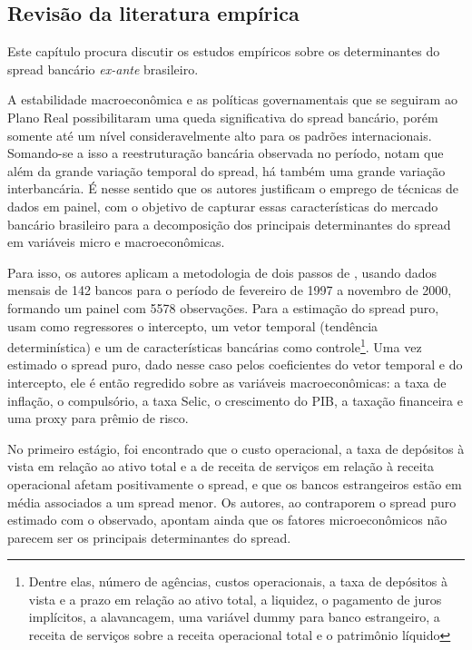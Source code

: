 \documentclass[a4paper,
               article,
               12pt,
               openany,
               oneside,
               english,
               brazil]{abntex2}
\numberwithin{equation}{section}
\begin{document}
\subsection{Revisão da literatura empírica}

    Este capítulo procura discutir os estudos empíricos sobre os determinantes do spread bancário \textit{ex-ante} brasileiro.

    A estabilidade macroeconômica e as políticas governamentais que se seguiram ao Plano Real possibilitaram uma queda significativa do spread bancário, porém somente até um nível consideravelmente alto para os padrões internacionais. Somando-se a isso a reestruturação bancária observada no período, \textcite{afanasieff02} notam que além da grande variação temporal do spread, há também uma grande variação interbancária. É nesse sentido que os autores justificam o emprego de técnicas de dados em painel, com o objetivo de capturar essas características do mercado bancário brasileiro para a decomposição dos principais determinantes do spread em variáveis micro e macroeconômicas.

    Para isso, os autores aplicam a metodologia de dois passos de \textcite{hoesaunders}, usando dados mensais de 142 bancos para o período de fevereiro de 1997 a novembro de 2000, formando um painel com 5578 observações. Para a estimação do spread puro, usam como regressores o intercepto, um vetor temporal (tendência determinística) e um de características bancárias como controle\footnote{Dentre elas, número de agências, custos operacionais, a taxa de depósitos à vista e a prazo em relação ao ativo total, a liquidez, o pagamento de juros implícitos, a alavancagem, uma variável dummy para banco estrangeiro, a receita de serviços sobre a receita operacional total e o patrimônio líquido}. Uma vez estimado o spread puro, dado nesse caso pelos coeficientes do vetor temporal e do intercepto, ele é então regredido sobre as variáveis macroeconômicas: a taxa de inflação, o compulsório, a taxa Selic, o crescimento do PIB, a taxação financeira e uma proxy para prêmio de risco.

    No primeiro estágio, foi encontrado que o custo operacional, a taxa de depósitos à vista em relação ao ativo total e a de receita de serviços em relação à receita operacional afetam positivamente o spread, e que os bancos estrangeiros estão em média associados a um spread menor. Os autores, ao contraporem o spread puro estimado com o observado, apontam ainda que os fatores microeconômicos não parecem ser os principais determinantes do spread.
    
\end{document}
